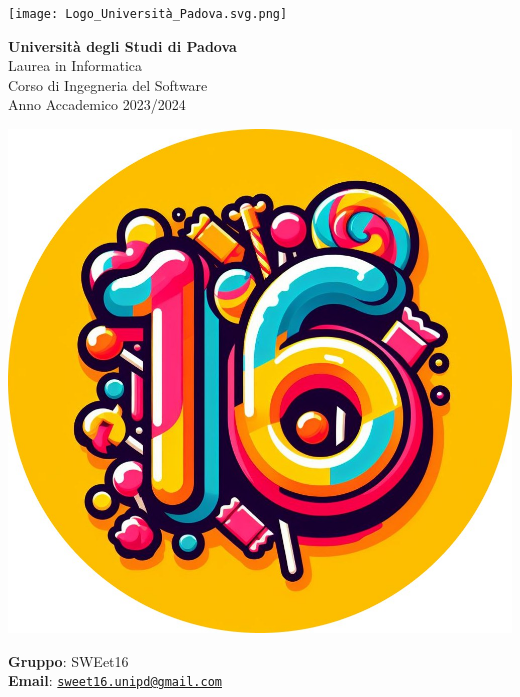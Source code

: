 \documentclass[a4paper, 11pt]{article}
\begin{document}
\begin{minipage}{0.35\linewidth}
    \texttt{[image: Logo\_Università\_Padova.svg.png]}
\end{minipage}\hfil
\begin{minipage}{0.55\linewidth}
\textbf{Università degli Studi di Padova} \\
Laurea in Informatica \\
Corso di Ingegneria del Software \\
Anno Accademico 2023/2024
\end{minipage}

\vspace{5mm}

\begin{minipage}{0.35\linewidth}
    \includegraphics[width=\linewidth]{logo rotondo.jpg}
\end{minipage}\hfil
\begin{minipage}{0.55\linewidth}
\textbf{Gruppo}: SWEet16 \\
\textbf{Email}:
\href{mailto:sweet16.unipd@gmail.com}{\nolinkurl{sweet16.unipd@gmail.com}}
\end{minipage}

\vspace{15mm}
\end{document}
